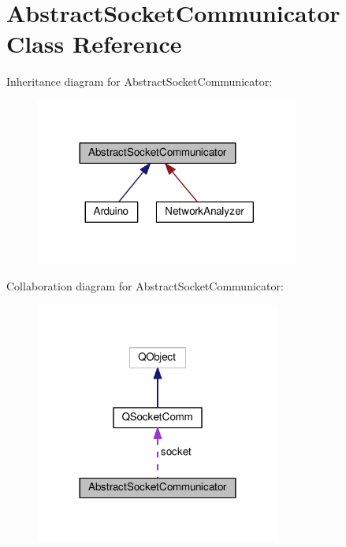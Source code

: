 \hypertarget{class_abstract_socket_communicator}{}\section{Abstract\+Socket\+Communicator Class Reference}
\label{class_abstract_socket_communicator}


Inheritance diagram for Abstract\+Socket\+Communicator\+:
\nopagebreak
\begin{figure}[H]
\begin{center}
\leavevmode
\includegraphics[width=245pt]{class_abstract_socket_communicator__inherit__graph}
\end{center}
\end{figure}


Collaboration diagram for Abstract\+Socket\+Communicator\+:
\nopagebreak
\begin{figure}[H]
\begin{center}
\leavevmode
\includegraphics[width=228pt]{class_abstract_socket_communicator__coll__graph}
\end{center}
\end{figure}
